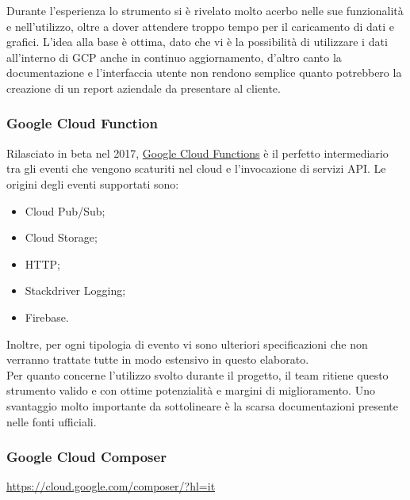 Durante l'esperienza lo strumento si è rivelato molto acerbo nelle sue funzionalità e nell'utilizzo, oltre a dover attendere troppo tempo per il caricamento di dati e grafici. L'idea alla base è ottima, dato che vi è la possibilità di utilizzare i dati all'interno di GCP anche in continuo aggiornamento, d'altro canto la documentazione e l'interfaccia utente non rendono semplice quanto potrebbero la creazione di un report aziendale da presentare al cliente.
\subsubsection{Google Cloud Function}
Rilasciato in beta nel 2017, \href{https://cloud.google.com/functions/}{Google Cloud Functions} è il perfetto intermediario tra gli eventi che vengono scaturiti nel cloud e l'invocazione di servizi API. Le origini degli eventi supportati sono:
\begin{itemize}
	\item Cloud Pub/Sub;
	\item Cloud Storage;
	\item HTTP;
	\item Stackdriver Logging;
	\item Firebase. 
\end{itemize}
Inoltre, per ogni tipologia di evento vi sono ulteriori specificazioni che non verranno trattate tutte in modo estensivo in questo elaborato.
\\
Per quanto concerne l'utilizzo svolto durante il progetto, il team ritiene questo strumento valido e con ottime potenzialità e margini di miglioramento. Uno svantaggio molto importante da sottolineare è la scarsa documentazioni presente nelle fonti ufficiali.
\subsubsection{Google Cloud Composer}
\url{https://cloud.google.com/composer/?hl=it}
